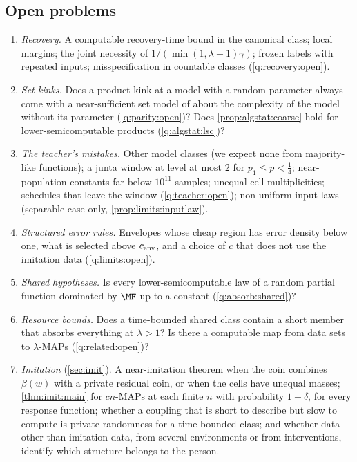 \subsection{Open problems}\label{sec:discussion:open}

\begin{enumerate}[label=(\arabic*),itemsep=0pt,topsep=2pt]
\item \emph{Recovery.} A computable recovery-time bound in the canonical class; local margins; the joint necessity of $1/(\min(1,\lambda-1)\gamma)$; frozen labels with repeated inputs; misspecification in countable classes (\cref{q:recovery:open}).
\item \emph{Set kinks.} Does a product kink at a model with a random parameter always come with a near-sufficient set model of about the complexity of the model without its parameter (\cref{q:parity:open})? Does \cref{prop:algstat:coarse} hold for lower-semicomputable products (\cref{q:algstat:lsc})?
\item \emph{The teacher's mistakes.} Other model classes (we expect none from majority-like functions); a junta window at level at most $2$ for $p_1\le p<\frac14$; near-population constants far below $10^{11}$ samples; unequal cell multiplicities; schedules that leave the window (\cref{q:teacher:open}); non-uniform input laws (separable case only, \cref{prop:limits:inputlaw}).
\item \emph{Structured error rules.} Envelopes whose cheap region has error density below one, what is selected above $c_{\rm env}$, and a choice of $c$ that does not use the imitation data (\cref{q:limits:open}).
\item \emph{Shared hypotheses.} Is every lower-semicomputable law of a random partial function dominated by $\MF$ up to a constant (\cref{q:absorb:shared})?
\item \emph{Resource bounds.} Does a time-bounded shared class contain a short member that absorbs everything at $\lambda>1$? Is there a computable map from data sets to $\lambda$-MAPs (\cref{q:related:open})?
\item \emph{Imitation} (\cref{sec:imit}). A near-imitation theorem when the coin combines $\beta(w)$ with a private residual coin, or when the cells have unequal masses; \cref{thm:imit:main} for $cn$-MAPs at each finite $n$ with probability $1-\delta$, for every response function; whether a coupling that is short to describe but slow to compute is private randomness for a time-bounded class; and whether data other than imitation data, from several environments or from interventions, identify which structure belongs to the person.
\end{enumerate}

